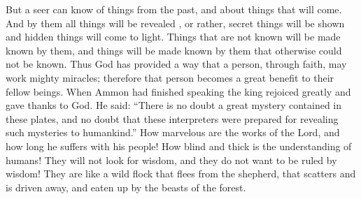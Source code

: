 But a seer can know of things from the past, and about things that will come. And by them all things will be revealed , or rather, secret things will be shown and hidden things will come to light. Things that are not known will be made known by them, and things will be made known by them that otherwise could not be known.
\bverse \iffalse Thus God has provided a means that man, through faith, might work mighty miracles; therefore he becometh a great benefit to his fellow beings. \fi
Thus God has provided a way that a person, through faith, may work mighty miracles; therefore that person becomes a great benefit to their fellow beings.
\bverse \iffalse And now, when Ammon had made an end of speaking these words the king rejoiced exceedingly, and gave thanks to God, saying: Doubtless a great mystery is contained within these plates, and these interpreters were doubtless prepared for the purpose of unfolding all such mysteries to the children of men. \fi
When Ammon had finished speaking the king rejoiced greatly and gave thanks to God. He said:  ``There is no doubt a great mystery contained in these plates, and no doubt that these interpreters were prepared for revealing such mysteries to humankind.''
\bverse \iffalse O how marvelous are the works of the Lord, and how long doth he suffer with his people; yea, and how blind and impenetrable are the understandings of the children of men; for they will not seek wisdom, neither do they desire that she should rule over them! \fi
How marvelous are the works of the Lord, and how long he suffers with his people! How blind and thick is the understanding of humans! They will not look for wisdom, and they do not want to be ruled by wisdom!
\bverse \iffalse Yea, they are as a wild flock which fleeth from the shepherd, and scattereth, and are driven, and are devoured by the beasts of the forest. \fi
They are like a wild flock that flees from the shepherd, that scatters and is driven away, and eaten up by the beasts of the forest.

